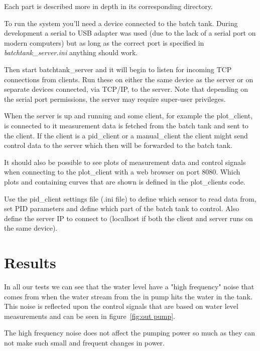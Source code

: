 \documentclass{article}
\begin{document}
Each part is described more in depth in its corresponding directory.

To run the system you'll need a device connected to the batch tank.
During development a serial to USB adapter was used (due to the lack of a serial
port on modern computers) but as long as the correct port is specified in
\emph{batchtank\_server.ini} anything should work.

Then start batchtank\_server and it will begin to listen for incoming TCP
connections from clients. Run these on either the same device as the server or on
separate devices connected, via TCP/IP, to the server. Note that depending on the
serial port permissions, the server may require super-user privileges.

When the server is up and running and some client, for example the plot\_client,
is connected to it measurement data is fetched from the batch tank and sent to
the client. If the client is a pid\_client or a manual\_client the client might 
send control data to the server which then will be forwarded to the batch tank.

It should also be possible to see plots of measurement data and control signals
when connecting to the plot\_client with a web browser on port 8080. Which plots 
and containing curves that are shown is defined in the plot\_clients code.

Use the pid\_client settings file (.ini file) to define which sensor to read data 
from, set PID parameters and define which part of the batch tank to control. Also 
define the server IP to connect to (localhost if both the client and server runs
on the same device).

\section{Results}\label{results}
In all our tests we can see that the water level have a "high frequency" noise
that comes from when the water stream from the in pump hits the water in the
tank. This noise is reflected upon the control signals that are based on water
level measurements and can be seen in figure~\ref{fig:out pump}. 

The high frequency noise does not affect the pumping power so much as they can 
not make such small and frequent changes in power.
\end{document}
